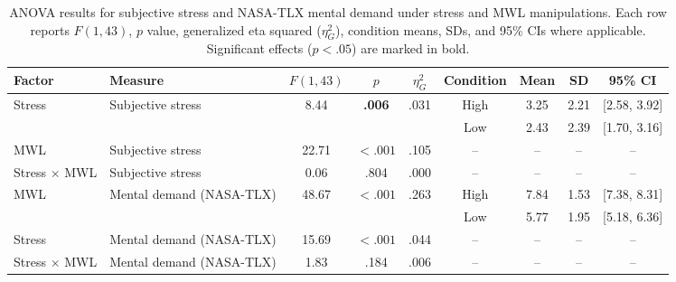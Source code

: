 \documentclass[lettersize,journal]{IEEEtran}
\begin{document}
\begin{table}[!t]
\centering
\caption{ANOVA results for subjective stress and NASA-TLX mental demand under stress and MWL manipulations. Each row reports $F(1,43)$, $p$ value, generalized eta squared ($\eta^2_G$), condition means, SDs, and 95\% CIs where applicable. Significant effects ($p < .05$) are marked in bold.}
\label{tab:anova_results}
\begin{tabular}{llccccccc}
\toprule
Factor & Measure & $F(1,43)$ & $p$ & $\eta^2_G$ & Condition & Mean & SD & 95\% CI \\
\midrule
\multirow{2}{*}{Stress} & \multirow{2}{*}{Subjective stress}
& 8.44 & \textbf{.006} & .031 & High & 3.25 & 2.21 & [2.58, 3.92] \\
& & & & & Low & 2.43 & 2.39 & [1.70, 3.16] \\
MWL & Subjective stress
& 22.71 & \textbf{$<.001$} & .105 & -- & -- & -- & -- \\
Stress $\times$ MWL & Subjective stress
& 0.06 & .804 & .000 & -- & -- & -- & -- \\
\midrule
MWL & \multirow{2}{*}{Mental demand (NASA-TLX)}
& 48.67 & \textbf{$<.001$} & .263 & High & 7.84 & 1.53 & [7.38, 8.31] \\
& & & & & Low & 5.77 & 1.95 & [5.18, 6.36] \\
Stress & Mental demand (NASA-TLX)
& 15.69 & \textbf{$<.001$} & .044 & -- & -- & -- & -- \\
Stress $\times$ MWL & Mental demand (NASA-TLX)
& 1.83 & .184 & .006 & -- & -- & -- & -- \\
\bottomrule
\end{tabular}
\end{table}
\end{document}
